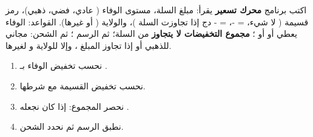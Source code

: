 \begin{statement}
اكتب برنامج \textbf{محرك تسعير} يقرأ: مبلغ السلة، مستوى الوفاء ( عادي،  فضي،  ذهبي)، رمز قسيمة ( لا شيء،  = -،  = - دج إذا تجاوزت السلة )، والولاية ( أو غيرها). القواعد: الوفاء يعطي  أو  أو ؛ \textbf{مجموع التخفيضات لا يتجاوز } من السلة؛ ثم الرسم ؛ ثم الشحن: مجاني للذهبي أو إذا تجاوز المبلغ ، وإلا  للولاية  و لغيرها.
\end{statement}
\begin{stepsbox}\begin{enumerate}
\item نحسب تخفيض الوفاء  بـ .
\item نحسب تخفيض القسيمة  مع شرطها.
\item نحصر المجموع: إذا كان  نجعله .
\item نطبق الرسم ثم نحدد الشحن.
\end{enumerate}\end{stepsbox}
